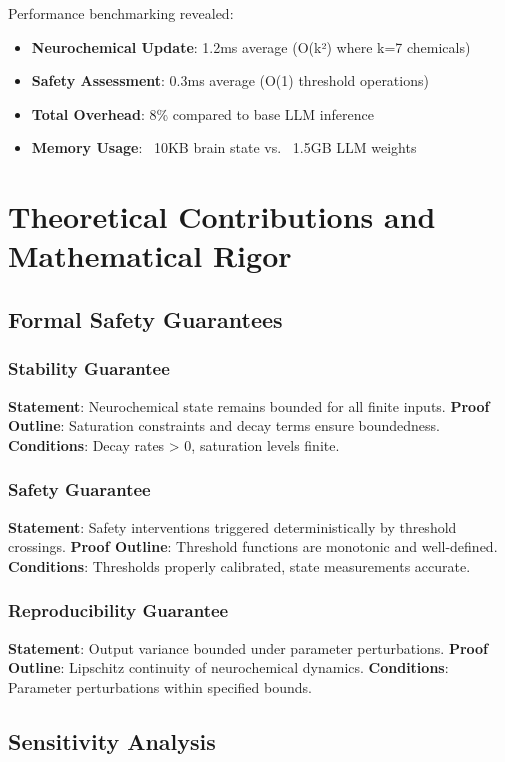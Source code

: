 \documentclass[12pt]{article}
\begin{document}
Performance benchmarking revealed:
\begin{itemize}
\item \textbf{Neurochemical Update}: 1.2ms average (O(k²) where k=7 chemicals)
\item \textbf{Safety Assessment}: 0.3ms average (O(1) threshold operations)
\item \textbf{Total Overhead}: 8\% compared to base LLM inference
\item \textbf{Memory Usage}: ~10KB brain state vs. ~1.5GB LLM weights
\end{itemize}

\section{Theoretical Contributions and Mathematical Rigor}

\subsection{Formal Safety Guarantees}

\subsubsection{Stability Guarantee}
\textbf{Statement}: Neurochemical state remains bounded for all finite inputs.
\textbf{Proof Outline}: Saturation constraints and decay terms ensure boundedness.
\textbf{Conditions}: Decay rates > 0, saturation levels finite.

\subsubsection{Safety Guarantee}
\textbf{Statement}: Safety interventions triggered deterministically by threshold crossings.
\textbf{Proof Outline}: Threshold functions are monotonic and well-defined.
\textbf{Conditions}: Thresholds properly calibrated, state measurements accurate.

\subsubsection{Reproducibility Guarantee}
\textbf{Statement}: Output variance bounded under parameter perturbations.
\textbf{Proof Outline}: Lipschitz continuity of neurochemical dynamics.
\textbf{Conditions}: Parameter perturbations within specified bounds.

\subsection{Sensitivity Analysis}
\end{document}
